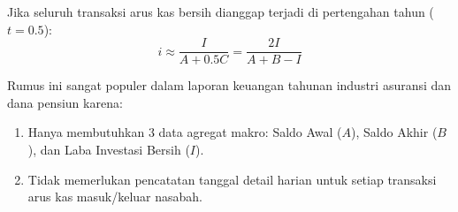 \documentclass[11pt,a4paper]{article}
\begin{document}
\begin{definitionbox}
Jika seluruh transaksi arus kas bersih dianggap terjadi di pertengahan tahun ($t = 0.5$):
\begin{equation}
    i \approx \frac{I}{A + 0.5 C} = \frac{2I}{A + B - I}
\end{equation}
\end{definitionbox}

\begin{notebox}
Rumus ini sangat populer dalam laporan keuangan tahunan industri asuransi dan dana pensiun karena:
\begin{enumerate}[label=\alph*.]
    \item Hanya membutuhkan 3 data agregat makro: Saldo Awal ($A$), Saldo Akhir ($B$), dan Laba Investasi Bersih ($I$).
    \item Tidak memerlukan pencatatan tanggal detail harian untuk setiap transaksi arus kas masuk/keluar nasabah.
\end{enumerate}
\end{notebox}
\end{document}
